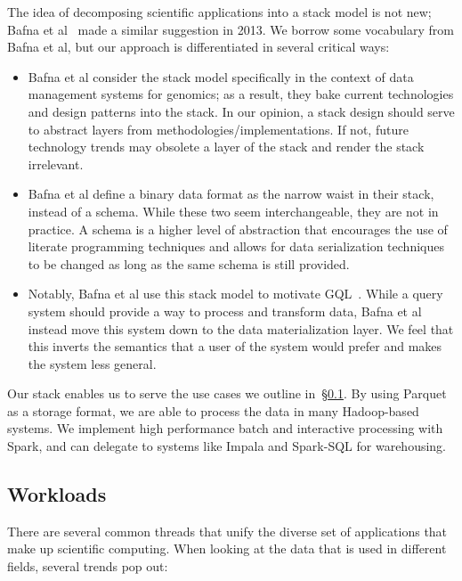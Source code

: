 \documentclass{acm_proc_article-sp}
\begin{document}
The idea of decomposing scientific applications into a stack model is not new; Bafna et al~\cite{bafna13}
made a similar suggestion in 2013. We borrow some vocabulary from Bafna et al, but our approach is
differentiated in several critical ways:

\begin{itemize}
\item Bafna et al consider the stack model specifically in the context of data management systems for
genomics; as a result, they bake current technologies and design patterns into the stack. In our opinion,
a stack design should serve to abstract layers from methodologies/implementations. If not, future
technology trends may obsolete a layer of the stack and render the stack irrelevant.
\item Bafna et al define a binary data format as the narrow waist in their stack, instead of a schema.
While these two seem interchangeable, they are not in practice. A schema is a higher level of abstraction
that encourages the use of literate programming techniques and allows for data serialization techniques to be
changed as long as the same schema is still provided.
\item Notably, Bafna et al use this stack model to motivate GQL~\cite{kozanitis14}. While a query system
should provide a way to process and transform data, Bafna et al instead move this system down to the
data materialization layer. We feel that this inverts the semantics that a user of the system would prefer
and makes the system less general.
\end{itemize}

Our stack enables us to serve the use cases we outline in~\S\ref{sec:workloads}. By using
Parquet as a storage format, we are able to process the data in many Hadoop-based systems. We
implement high performance batch and interactive processing with \linebreak Spark, and can delegate to systems
like Impala and Spark-SQL for warehousing.

\subsection{Workloads}
\label{sec:workloads}

There are several common threads that unify the diverse set of applications that make up scientific
computing. When looking at the data that is used in different fields, several trends pop out:
\end{document}
